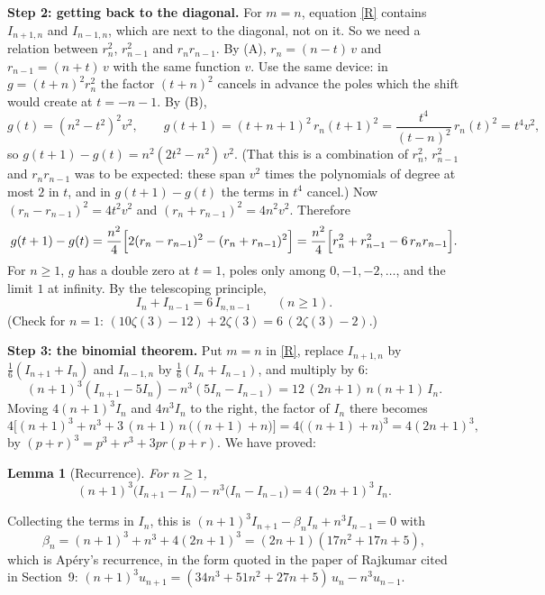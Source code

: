 \documentclass[11pt]{article}
\newtheorem{lemma}{Lemma}
\newcommand{\q}[1]{\medskip\noindent\textbf{#1}}
\begin{document}
\q{Step 2: getting back to the diagonal.} For $m=n$, equation \eqref{R} contains $I_{n+1,n}$ and
$I_{n-1,n}$, which are next to the diagonal, not on it. So we need a relation between $r_n^2$,
$r_{n-1}^2$ and $r_nr_{n-1}$. By (A), $r_n=(n-t)\,v$ and $r_{n-1}=(n+t)\,v$ with the same function
$v$. Use the same device: in $g=(t+n)^2r_n^2$ the factor $(t+n)^2$ cancels in advance the poles
which the shift would create at $t=-n-1$. By (B),
\[
g(t)=(n^2-t^2)^2v^2,\qquad g(t+1)=(t+n+1)^2\,r_n(t+1)^2=\frac{t^4}{(t-n)^2}\,r_n(t)^2=t^4v^2 ,
\]
so $g(t+1)-g(t)=n^2(2t^2-n^2)\,v^2$. (That this is a combination of $r_n^2$, $r_{n-1}^2$ and
$r_nr_{n-1}$ was to be expected: these span $v^2$ times the polynomials of degree at most $2$ in
$t$, and in $g(t+1)-g(t)$ the terms in $t^4$ cancel.) Now $(r_n-r_{n-1})^2=4t^2v^2$ and
$(r_n+r_{n-1})^2=4n^2v^2$. Therefore
\begin{equation}\label{six}
g(t+1)-g(t)=\frac{n^2}4\Bigl[2(r_n-r_{n-1})^2-(r_n+r_{n-1})^2\Bigr]
=\frac{n^2}4\Bigl[r_n^2+r_{n-1}^2-6\,r_nr_{n-1}\Bigr].
\end{equation}
For $n\ge1$, $g$ has a double zero at $t=1$, poles only among $0,-1,-2,\dots$, and the limit $1$
at infinity. By the telescoping
principle,
\begin{equation}\label{D}
I_n+I_{n-1}=6\,I_{n,n-1}\qquad(n\ge1).
\end{equation}
(Check for $n=1$: $(10\zeta(3)-12)+2\zeta(3)=6\,(2\zeta(3)-2)$.)

\q{Step 3: the binomial theorem.} Put $m=n$ in \eqref{R}, replace $I_{n+1,n}$ by
$\frac16(I_{n+1}+I_n)$ and $I_{n-1,n}$ by $\frac16(I_n+I_{n-1})$, and multiply by $6$:
\[
(n+1)^3(I_{n+1}-5I_n)-n^3(5I_n-I_{n-1})=12\,(2n+1)\,n(n+1)\,I_n .
\]
Moving $4(n+1)^3I_n$ and $4n^3I_n$ to the right, the factor of $I_n$ there becomes
\[
4\bigl[(n+1)^3+n^3+3\,(n+1)\,n\,\bigl((n+1)+n\bigr)\bigr]=4\bigl((n+1)+n\bigr)^3=4(2n+1)^3 ,
\]
by $(p+r)^3=p^3+r^3+3pr(p+r)$. We have proved:

\begin{lemma}[Recurrence]\label{lem:rec}
For $n\ge1$,
\begin{equation}\label{star}
(n+1)^3\bigl(I_{n+1}-I_n\bigr)-n^3\bigl(I_n-I_{n-1}\bigr)=4(2n+1)^3\,I_n .
\end{equation}
\end{lemma}
\noindent Collecting the terms in $I_n$, this is
$(n+1)^3I_{n+1}-\beta_nI_n+n^3I_{n-1}=0$ with
\[
\beta_n=(n+1)^3+n^3+4(2n+1)^3=(2n+1)(17n^2+17n+5),
\]
which is Ap\'ery's recurrence, in the form quoted in the paper of Rajkumar cited in Section~9:
$(n+1)^3u_{n+1}=(34n^3+51n^2+27n+5)\,u_n-n^3u_{n-1}$.
\end{document}
